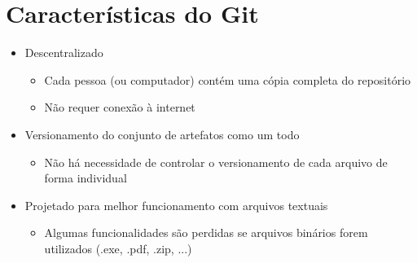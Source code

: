 \documentclass{beamer}
\newenvironment{slide}{\begin{frame}{\insertsection}}{\end{frame}}
\begin{document}
\section{Características do Git}
\begin{slide}
    \begin{itemize}
        \item Descentralizado
        \begin{itemize}
            \pause
            \item Cada pessoa (ou computador) contém uma cópia completa do
                repositório
            \pause
            \item Não requer conexão à internet
        \end{itemize}
        \pause
        \item Versionamento do conjunto de artefatos como um todo
        \begin{itemize}
            \pause
            \item Não há necessidade de controlar o versionamento de cada
                arquivo de forma individual
        \end{itemize}
        \pause
        \item Projetado para melhor funcionamento com arquivos textuais
        \begin{itemize}
            \pause
            \item Algumas funcionalidades são perdidas se arquivos binários
                forem utilizados \pause (.exe, .pdf, .zip, ...)
        \end{itemize}
    \end{itemize}
\end{slide}
\end{document}
